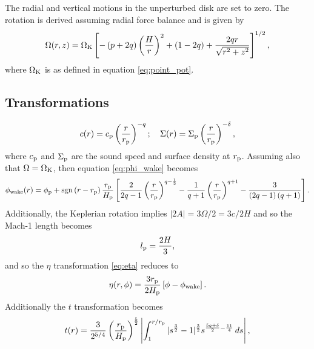 The radial and vertical motions in the unperturbed disk are set to zero. 
The rotation is derived assuming radial force balance \citep[eg.][]{nelson2013} and is given by 
\begin{align}
    \Omega(r,z) = \Omega_{\rm K} \left[ - \left(p + 2q\right) \left( \frac{H}{r} \right)^2 + \left( 1-2q \right) + \frac{2qr}{\sqrt{r^2 + z^2}}\right]^{1/2},
\end{align}
where $\Omega_{\rm K}$ is as defined in equation \ref{eq:point_pot}.

\subsection{Transformations}

\begin{align}
    c(r) = c_{\rm p} \left(\frac{r}{r_{\rm p}}\right)^{-q}; \quad \Sigma(r) = \Sigma_{\rm p} \left(\frac{r}{r_{\rm p}}\right)^{-\delta},
\end{align}
where $c_{\rm p}$ and $\Sigma_{\rm p}$ are the sound speed and surface density at $r_{\rm p}$.
Assuming also that $\Omega=\Omega_{\rm K}$, then equation \ref{eq:phi_wake} becomes \citep{rafikov2002a}
\begin{align}
    \phi_{\rm wake}(r) = \phi_{\rm p} + {\rm sgn} \left( r - r_{\rm p} \right) \frac{r_{\rm p}}{H_{\rm p}} \left[ \frac{2}{2q-1} \left(\frac{r}{r_{\rm p}}\right)^{q-\frac{1}{2}} - \frac{1}{q+1} \left(\frac{r}{r_{\rm p}}\right)^{q+1} - \frac{3}{\left(2q-1\right)\left(q+1\right)} \right].
\end{align}
Additionally, the Keplerian rotation implies $|2A| = 3\Omega/2 = 3c/2H$ and so the Mach-1 length becomes
\begin{align}
    l_{\rm p} = \frac{2H}{3},
\end{align}
and so the $\eta$ transformation \ref{eq:eta} reduces to 
\begin{align}
    \eta(r, \phi) = \frac{3 r_{\rm p}}{2 H_{\rm p}} \left[ \phi - \phi_{\rm wake} \right].
\end{align}
Additionally the $t$ transformation becomes \citep{rafikov2002a}
\begin{align}
    t(r) = \frac{3}{2^{5/4}} \left( \frac{r_{\rm p}}{H_{\rm p}} \right)^{\frac{5}{2}} \left| \int_1^{r/r_{\rm p}} |s^\frac{3}{2} - 1|^\frac{3}{2} s^{\frac{5q+\delta}{2}-\frac{11}{4}}\, ds \right|, \label{eq:t_power}
\end{align}
